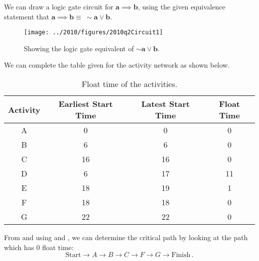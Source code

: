 \begin{subquestions}
\subquestion

We can draw a logic gate circuit for $\boldsymbol{a \implies b}$, using the given equivalence statement that $\boldsymbol{a \implies b \equiv \ \sim a \lor b}$.
\begin{figure}[H]
	\begin{center}
		\texttt{[image: ../2010/figures/2010q2Circuit1]}
		\caption{\label{2010:q2:fig:Circuit1} Showing the logic gate equivalent of $\boldsymbol{\sim a \lor b}$.}
	\end{center}
\end{figure}


\subquestion

\begin{subsubquestions}


\subsubquestion

We can complete the table given for the activity network as shown below.
\begin{table}[H]
	\centering
	\begin{tabular}{|c|c|c|c|}
		\hline
		Activity & Earliest Start Time & Latest Start Time & Float Time \\
		\hline
		A & 0 & 0 & 0 \\
		B & 6 & 6 & 0 \\
		C & 16 & 16 & 0 \\
		D & 6 & 17 & 11 \\
		E & 18 & 19 & 1 \\
		F & 18 & 18 & 0 \\
		G & 22 & 22 & 0 \\
		\hline
	\end{tabular}
	\caption{\label{2011:q2:tab:CritPath} Float time of the activities.}
\end{table}


\subsubquestion

From  and using  and , we can determine the critical path by looking at the path which has 0 float time:
\begin{equation}
	\text{Start} \rightarrow A \rightarrow B \rightarrow C \rightarrow F \rightarrow G \rightarrow \text{Finish}\,.
\end{equation}

\end{subsubquestions}

\end{subquestions}


